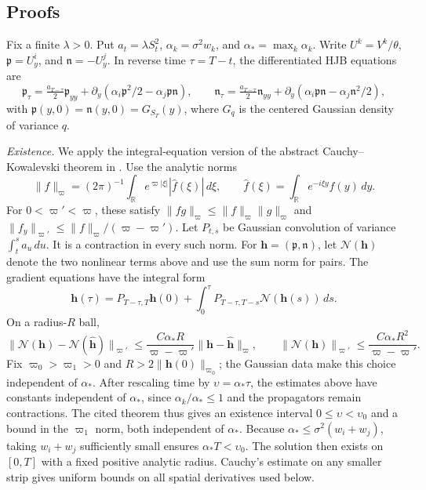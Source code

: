 \documentclass[mnsc]{informs3}
\begin{document}
\newpage
\begin{APPENDICES}
\renewcommand{\theHsection}{appendix.\Alph{section}}
\renewcommand{\theHsubsection}{\theHsection.\arabic{subsection}}


\section{Proofs}

{{
Fix a finite $\lambda>0$. Put $a_t=\lambda S_t^2$,
$\alpha_k=\sigma^2w_k$, and $\alpha_*=\max_k\alpha_k$.
Write $U^k=V^k/\theta$, ${\mathfrak p}=U_y^i$, and ${\mathfrak n}=-U_y^j$.
In reverse time $\tau=T-t$, the differentiated HJB equations are
\[
{\mathfrak p}_\tau=\tfrac{a_{T-\tau}}2{\mathfrak p}_{yy}
+\partial_y(\alpha_i{\mathfrak p}^2/2-\alpha_j{\mathfrak p}{\mathfrak n}),\qquad
{\mathfrak n}_\tau=\tfrac{a_{T-\tau}}2{\mathfrak n}_{yy}
+\partial_y(\alpha_i{\mathfrak p}{\mathfrak n}-\alpha_j{\mathfrak n}^2/2),
\]
with ${\mathfrak p}(y,0)={\mathfrak n}(y,0)=G_{S_T}(y)$, where $G_q$ is the centered
Gaussian density of variance $q$.

\emph{Existence.}
We apply the integral-equation version of the abstract
Cauchy--Kowalevski theorem in \citet[][Chapter III, Remark 2.3]{Nishida1978}.
Use the analytic norms
\[
\|f\|_\varpi=(2\pi)^{-1}\int_{\mathbb R}
e^{\varpi|\xi|}|\widehat f(\xi)|\,d\xi,
\qquad \widehat f(\xi)=\int_{\mathbb R}e^{-i\xi y}f(y)\,dy.
\]
For $0<\varpi'<\varpi$, these satisfy
$\|fg\|_\varpi\leq\|f\|_\varpi\|g\|_\varpi$ and
$\|f_y\|_{\varpi'}\leq\|f\|_\varpi/(\varpi-\varpi')$.
Let $P_{t,s}$ be Gaussian convolution of variance $\int_t^sa_u\,du$.
It is a contraction in every such norm.
For ${\mathbf h}=({\mathfrak p},{\mathfrak n})$, let $\mathscr N({\mathbf h})$ denote the two nonlinear terms
above and use the sum norm for pairs. The gradient equations have
the integral form
\begin{equation}\label{eq-equilibrium-gradient-mild}
{\mathbf h}(\tau)=P_{T-\tau,T}{\mathbf h}(0)
+\int_0^\tau P_{T-\tau,T-s}\mathscr N({\mathbf h}(s))\,ds.
\end{equation}
On a radius-$R$ ball,
\[
\|\mathscr N({\mathbf h})-\mathscr N(\widehat {\mathbf h})\|_{\varpi'}
\leq\frac{C\alpha_*R}{\varpi-\varpi'}\|{\mathbf h}-\widehat {\mathbf h}\|_\varpi,
\qquad
\|\mathscr N({\mathbf h})\|_{\varpi'}\leq
\frac{C\alpha_*R^2}{\varpi-\varpi'}.
\]
Fix $\varpi_0>\varpi_1>0$ and $R>2\|{\mathbf h}(0)\|_{\varpi_0}$;
the Gaussian data make this choice independent of $\alpha_*$.
After rescaling time by ${\upsilon}=\alpha_*\tau$, the estimates above have
constants independent of $\alpha_*$, since $\alpha_k/\alpha_*\leq1$
and the propagators remain contractions.
The cited theorem thus gives an existence interval $0\leq {\upsilon}<{\upsilon}_0$
and a bound in the $\varpi_1$ norm, both independent of $\alpha_*$.
Because $\alpha_*\leq\sigma^2(w_i+w_j)$, taking $w_i+w_j$ sufficiently
small ensures $\alpha_*T<{\upsilon}_0$. The solution then exists on $[0,T]$ with
a fixed positive analytic radius. Cauchy's estimate on any smaller strip
gives uniform bounds on all spatial derivatives used below.

}}
\end{APPENDICES}
\end{document}
